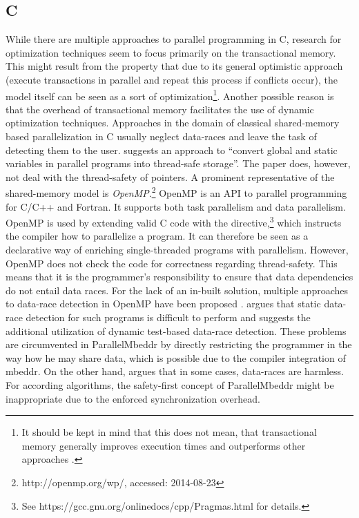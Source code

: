\subsection{C}
While there are multiple approaches to parallel programming in C, research for optimization techniques seem to focus primarily on the transactional memory\cite{DynamicPerformanceTuning}\cite{LoweringTheOverhead}. This might result from the property that due to its general optimistic approach (execute transactions in parallel and repeat this process if conflicts occur), the model itself can be seen as a sort of optimization\footnote{It should be kept in mind that this does not mean, that transactional memory generally improves execution times and outperforms other approaches \cite{ResearchToy}.}. Another possible reason is that the overhead of transactional memory \cite{LoweringTheOverhead} facilitates the use of dynamic optimization techniques. Approaches in the domain of classical shared-memory based parallelization in C usually neglect data-races \cite{HowToMiscompilePrograms} and leave the task of detecting them to the user. \cite{LocalizingGlobalsAndStatics} suggests an approach to ``convert global and static variables in parallel programs into thread-safe storage''. The paper does, however, not deal with the thread-safety of pointers. A prominent representative of the shared-memory model is \textit{OpenMP}.\footnote{http://openmp.org/wp/, accessed: 2014-08-23} OpenMP is an API to parallel programming for C/C++ and Fortran\cite[p.~1]{OpenMP}. It supports both task parallelism and data parallelism. OpenMP is used by extending valid C code with the  directive,\footnote{See https://gcc.gnu.org/onlinedocs/cpp/Pragmas.html for details.} which instructs the compiler how to parallelize a program. It can therefore be seen as a declarative way of enriching single-threaded programs with parallelism. However, OpenMP does not check the code for correctness regarding thread-safety. This means that it is the programmer's responsibility to ensure that data dependencies do not entail data races. For the lack of an in-built solution, multiple approaches to data-race detection in OpenMP have been proposed \cite{NonConcurrencyAnalysis}. \cite{OpenMPSupport} argues that static data-race detection for such programs is difficult to perform and suggests the additional utilization of dynamic test-based data-race detection. These problems are circumvented in ParallelMbeddr by directly restricting the programmer in the way how he may share data, which is possible due to the compiler integration of mbeddr. On the other hand, \cite{HowToMiscompilePrograms} argues that in some cases, data-races are harmless. For according algorithms, the safety-first concept of ParallelMbeddr might be inappropriate due to the enforced synchronization overhead.

